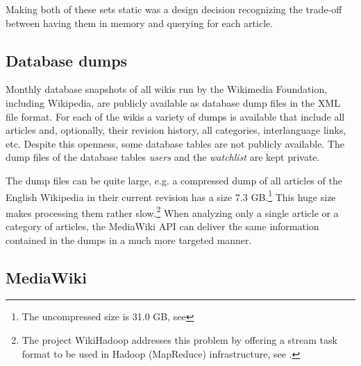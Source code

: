 Making both of these sets static was a design decision recognizing the trade-off between having them in memory and querying for each article.

\subsection{Database dumps}\label{sub:dumps}

Monthly database snapshots of all wikis run by the Wikimedia Foundation, including Wikipedia,  are publicly available as database dump files in the \ac{XML} file format.
For each of the wikis a variety of dumps is available that include all articles and, optionally, their revision history, all categories, interlanguage links, etc.
Despite this openness, some database tables are not publicly available.
The dump files of the database tables \emph{users} and the \emph{watchlist} are kept private.

The dump files can be quite large, e.g. a compressed dump of all articles of the English Wikipedia in their current revision has a size 7.3 GB.\footnote{The uncompressed size is 31.0 GB, see }
This huge size makes processing them rather slow.\footnote{The project WikiHadoop addresses this problem by offering a stream task format to be used in Hadoop (MapReduce) infrastructure, see .}
When analyzing only a single article or a category of articles, the MediaWiki \ac{API} can deliver the same information contained in the dumps in a much more targeted manner. 

\subsection{MediaWiki }\label{sub:mediawikiapi}

